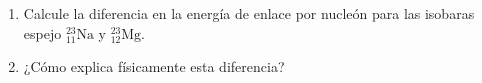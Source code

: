 \item \begin{enumerate}
    \item Calcule la diferencia en la energía de enlace por nucleón para las isobaras espejo $^{23}_{11}\text{Na}$ y $^{23}_{12}\text{Mg}$.
    \item ¿Cómo explica físicamente esta diferencia?
\end{enumerate}